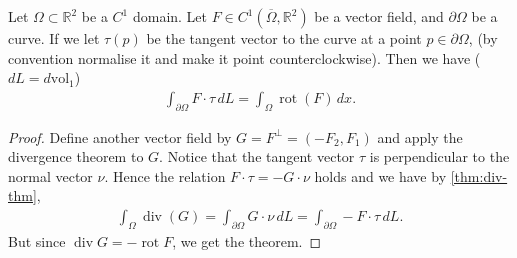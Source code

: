 \begin{theorem}\label{thm:green-thm}
	Let $\Omega \subset \mathbb{R}^{2}$ be a $C^{1}$ domain. Let $F \in C^{1}(\overline{ \Omega }, \mathbb{R}^{2})$ be a vector field, and $\partial \Omega$ be a curve. If we let $\tau(p)$ be the tangent vector to the curve at a point $p \in \partial \Omega$, (by convention normalise it and make it point counterclockwise). Then we have ($dL = d \text{vol}_{1}$)
	\begin{align*}
		\int_{\partial \Omega} F \cdot \tau \, dL = \int_{\Omega} \operatorname{rot}(F) \, dx.
	\end{align*}
\end{theorem}
\begin{proof}
	Define another vector field by $G = F^{\perp} = (-F_{2}, F_{1})$ and apply the divergence theorem to $G$. Notice that the tangent vector $\tau$ is perpendicular to the normal vector $\nu$. Hence the relation $F \cdot \tau = - G \cdot \nu$ holds and we have by \ref{thm:div-thm},
	\begin{align*}
		\int_{\Omega} \operatorname{div}(G) = \int_{\partial \Omega} G \cdot \nu \, dL = \int_{\partial \Omega} - F \cdot \tau \, dL.
	\end{align*}
	But since $\operatorname{div}G = -\operatorname{rot} F$, we get the theorem.
\end{proof}

